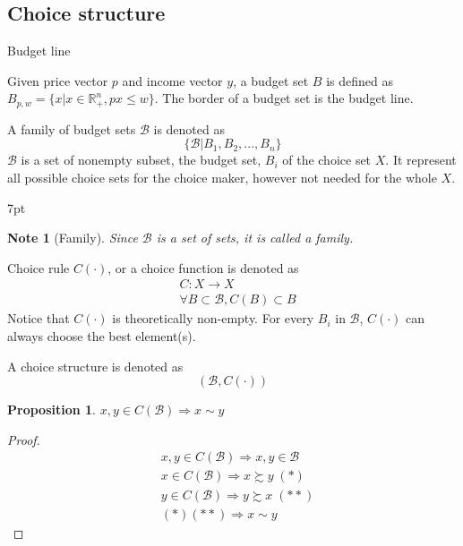 \documentclass{article}
\newenvironment{blueblock}{
\def\FrameCommand{
  \hspace{1pt}
    {\color{DarkBlue}
    \vrule width 2pt}
    {\color{blueshade}
    \vrule width 4pt}
  \colorbox{blueshade}
}
\MakeFramed{
  \advance
  \hsize-
  \width
  \FrameRestore}
\noindent\hspace{-4.55pt}%
\begin{adjustwidth}{}{7pt}
\vspace{2pt}\vspace{2pt}
}
{\vspace{2pt}\end{adjustwidth}\endMakeFramed}
\newtheorem{note}{Note}
\newtheorem{proposition}{Proposition}
\begin{document}
\subsection{Choice structure}

Budget line

Given price vector $p$ and income vector $y$, a budget set $B$ is defined as
$B_{p,w}=\{x|x\in \mathbb{R}_{+}^{n},px \leqslant w\}$. The border of a budget set is the budget line.

A family of budget sets $\mathscr{B}$ is denoted as
$$\{\mathscr{B}|B_{1},B_{2},...,B_{n}\}$$
$\mathscr{B}$ is a set of nonempty subset, the budget set, $B_{i}$ of the choice set $X$. It represent all possible choice sets for the choice maker, however not needed for the whole $X$.

\begin{blueblock}
\begin{note}[Family]
Since $\mathscr{B}$ is a set of sets, it is called a family.
\end{note}
\end{blueblock}


Choice rule $C(\cdot)$, or a choice function is denoted as
\begin{align}
&C:X\rightarrow X
\\& \forall B \subset \mathscr{B},C(B)\subset B
\end{align}
Notice that $C(\cdot)$ is theoretically non-empty. For every $B_{i}$ in $\mathscr{B}$, $C(\cdot)$ can always choose the best element(s). 

A choice structure is denoted as
$$(\mathscr{B},C(\cdot))$$


\begin{proposition}
$x,y \in C(\mathscr{B}) \Rightarrow x \sim y$
\end{proposition}

\begin{proof}
\begin{align}
&x,y\in C(\mathscr{B}) \Rightarrow x,y\in \mathscr{B}
\\&x\in C(\mathscr{B}) \Rightarrow x\succsim y \; (*)
\\&y\in C(\mathscr{B}) \Rightarrow y\succsim x \; (**)
\\&(*)(**) \Rightarrow x \sim y
\end{align}
\end{proof}
\end{document}
